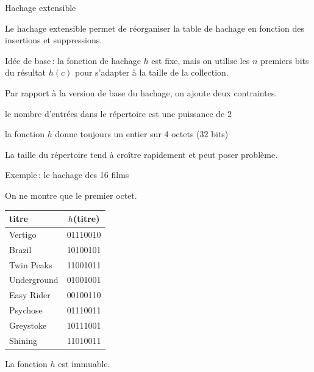 

\begin{frame}{Hachage extensible}

Le hachage extensible permet de réorganiser la table de hachage en fonction
des insertions et suppressions. 

\vfill

Idée de base\,: la fonction de hachage $h$ est fixe, \alert{mais} 
on utilise les $n$ premiers bits du résultat $h(c)$ 
pour s'adapter à la taille de la collection.

\vfill

Par rapport à la version de base du hachage, on ajoute deux contraintes.

\begin{redbullet}
  \item le nombre d'entrées dans le répertoire est une puissance
          de 2
  \item la fonction $h$ donne toujours un entier sur 4 octets (32 bits)  
\end{redbullet}

\vfill
\begin{blocgauche}
La taille du répertoire tend à croître rapidement et peut poser problème.
\end{blocgauche}
\end{frame}
\begin{frame}{Exemple\,: le hachage des 16 films}

On ne montre que le premier octet.

\vfill

\begin{tabular}{l|c}
titre & $h$(titre)   \\
\hline
Vertigo     & 01110010  \\
Brazil      & 10100101  \\
Twin Peaks  & 11001011  \\
Underground & 01001001  \\
Easy Rider  & 00100110 \\
Psychose    &  01110011 \\
Greystoke   &  10111001 \\
Shining     &  11010011 \\
\hline
\end{tabular}
\vfill

La fonction $h$ est immuable. 

\end{frame}
